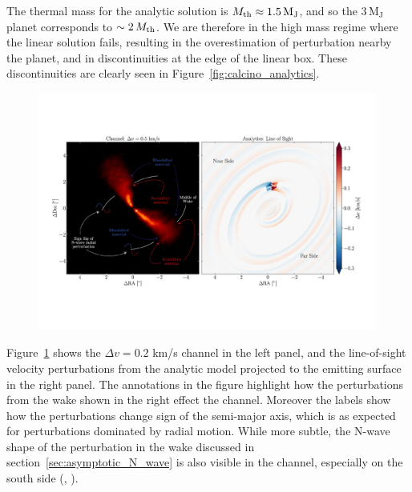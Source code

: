 The thermal mass for the analytic solution is $M_{\rm th} \approx 1.5 \, \mathrm{M_J}$, and so the $3 \, \mathrm{M_J}$ planet corresponds to $\sim 2 \, M_{\rm th}$.
We are therefore in the high mass regime where the linear solution fails, resulting in the overestimation of perturbation nearby the planet, and in discontinuities at the edge of the linear box.
These discontinuities are clearly seen in Figure~\ref{fig:calcino_analytics}.

\begin{figure}
    \centering
    \includegraphics[width = 0.99\textwidth]{figures/calcino_channel_comparison.pdf}
    \caption{}
    \label{fig:calcino_channel_comparison}
\end{figure}

Figure~\ref{fig:calcino_channel_comparison} shows the  $\Delta v = 0.2$ km/s channel in the left panel, and the line-of-sight velocity perturbations from the analytic model projected to the emitting surface in the right panel.
The annotations in the figure highlight how the perturbations from the wake shown in the right effect the channel.
Moreover the labels show how the perturbations change sign of the semi-major axis, which is as expected for perturbations dominated by radial motion.
While more subtle, the N-wave shape of the perturbation in the wake discussed in section~\ref{sec:asymptotic_N_wave} is also visible in the channel, especially on the south side (\citealt{rafikov2002a}, ).

